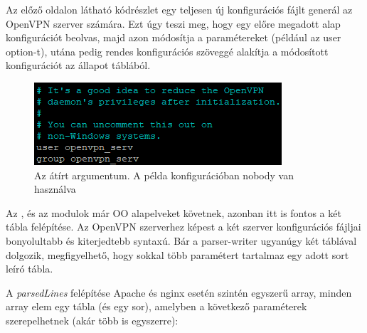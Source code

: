 Az előző oldalon látható kódrészlet egy teljesen új konfigurációs fájlt generál az OpenVPN szerver számára. Ezt úgy teszi meg, hogy egy előre megadott alap konfigurációt beolvas, majd azon módosítja a paramétereket (például az user option-t), utána pedig rendes konfigurációs szöveggé alakítja a módosított konfigurációt az állapot táblából.

\begin{figure}[h]
\centering
\includegraphics[scale=1.0]{images/openvpn_config_edit_example.png}
\caption{Az átírt  argumentum. A példa konfigurációban nobody van használva}
\end{figure}


Az \texttt{}, és az \texttt{} modulok már OO alapelveket követnek, azonban itt is fontos a két tábla felépítése. Az OpenVPN szerverhez képest a két szerver konfigurációs fájljai bonyolultabb és kiterjedtebb syntaxú. Bár a parser-writer ugyanúgy két táblával dolgozik, megfigyelhető, hogy sokkal több paramétert tartalmaz egy adott sort leíró tábla.

A \textit{parsedLines} felépítése Apache és nginx esetén szintén egyszerű array, minden array elem egy tábla (és egy sor), amelyben a következő paraméterek szerepelhetnek (akár több is egyszerre):

